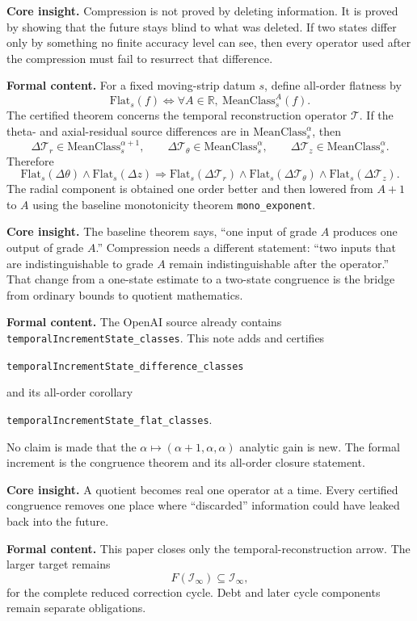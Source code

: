 \documentclass[11pt]{article}
\theoremstyle{highend}
\theoremstyle{definition}
\newcommand{\MeanClass}{\mathrm{MeanClass}}
\newcommand{\Flat}{\mathrm{Flat}}
\newcommand{\Iinf}{\mathcal I_{\infty}}
\newcommand{\Tmap}{\mathcal T}
\begin{document}
\begin{eurekabox}
\textbf{Core insight.} Compression is not proved by deleting information. It is proved by showing that the future stays blind to what was deleted. If two states differ only by something no finite accuracy level can see, then every operator used after the compression must fail to resurrect that difference.
\end{eurekabox}
\noindent\textbf{Formal content.}
For a fixed moving-strip datum \(s\), define all-order flatness by
\[
\Flat_s(f) \iff \forall A\in\mathbb R,\ \MeanClass_s^A(f).
\]
The certified theorem concerns the temporal reconstruction operator \(\Tmap\). If the theta- and axial-residual source differences are in \(\MeanClass_s^\alpha\), then
\[
\Delta \Tmap_r\in \MeanClass_s^{\alpha+1},\qquad
\Delta \Tmap_\theta\in \MeanClass_s^{\alpha},\qquad
\Delta \Tmap_z\in \MeanClass_s^{\alpha}.
\]
Therefore
\[
\Flat_s(\Delta \theta)\wedge \Flat_s(\Delta z)
\Longrightarrow
\Flat_s(\Delta \Tmap_r)\wedge \Flat_s(\Delta \Tmap_\theta)\wedge \Flat_s(\Delta \Tmap_z).
\]
The radial component is obtained one order better and then lowered from \(A+1\) to \(A\) using the baseline monotonicity theorem \texttt{mono\_exponent}.

\begin{eurekabox}
\textbf{Core insight.} The baseline theorem says, ``one input of grade \(A\) produces one output of grade \(A\).'' Compression needs a different statement: ``two inputs that are indistinguishable to grade \(A\) remain indistinguishable after the operator.'' That change from a one-state estimate to a two-state congruence is the bridge from ordinary bounds to quotient mathematics.
\end{eurekabox}
\noindent\textbf{Formal content.}
The OpenAI source already contains \texttt{temporalIncrementState\_classes}. This note adds and certifies
\begin{center}
\texttt{temporalIncrementState\_difference\_classes}
\end{center}
and its all-order corollary
\begin{center}
\texttt{temporalIncrementState\_flat\_classes}.
\end{center}
No claim is made that the \(\alpha\mapsto(\alpha+1,\alpha,\alpha)\) analytic gain is new. The formal increment is the congruence theorem and its all-order closure statement.

\begin{eurekabox}
\textbf{Core insight.} A quotient becomes real one operator at a time. Every certified congruence removes one place where ``discarded'' information could have leaked back into the future.
\end{eurekabox}
\noindent\textbf{Formal content.}
This paper closes only the temporal-reconstruction arrow. The larger target remains
\[
F(\Iinf)\subseteq \Iinf,
\]
for the complete reduced correction cycle. Debt and later cycle components remain separate obligations.
\end{document}
